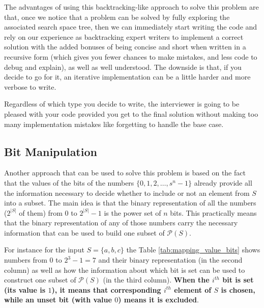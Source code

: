 The advantages of using this backtracking-like approach to solve this problem are that, once we notice
that a problem can be solved by fully exploring the associated search space tree, then we can immediately
start writing the code and rely on our experience as backtracking expert writers to implement a correct
solution with the added bonuses of being concise and short when written in a recursive  form (which gives you fewer chances to make mistakes, and less code to debug and explain),  as well
as well understood.
The downside is that, if you decide to go for it, an iterative implementation can be a little harder and more verbose to write.

Regardless of which type you decide to write, the interviewer is going to be pleased with your code provided you get to the final solution
without making too many implementation mistakes like forgetting to handle the base case.

\subsection{Bit Manipulation}

Another approach that can be used to solve this problem is based on the fact that the values of the
bits of the numbers $\{0,1,2,\ldots, s^n-1\}$  already provide all the information necessary to decide whether to include or not an element from $S$ into a subset. 
The main idea is that the binary representation of all the numbers ($2^{|S|}$ of them) from $0$ to $2^{|S|}-1$ is the power set of $n$ bits.
This practically means that the binary representation of any of those numbers carry the necessary information that can be used to build one subset of $\mathcal{P}(S)$. 


For instance for the input $S=\{a,b,c\}$ the Table \ref{tab:mapping_value_bits} shows numbers from $0$ to $2^3-1 = 7$ and their binary representation (in the second column) as well as how the information about which bit is set can be used to construct one
subset of $\mathcal{P}(S)$ (in the third column).
\textbf{When the $i^{th}$ bit is set (its value is $1$), it means that
corresponding $i^{th}$ element of $S$ is chosen, while an unset bit (with value $0$) means it is
excluded}.


